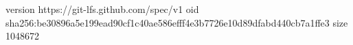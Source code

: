 version https://git-lfs.github.com/spec/v1
oid sha256:be30896a5e199ead90cf1c40ae586efff4e3b7726e10d89dfabd440cb7a1ffe3
size 1048672
